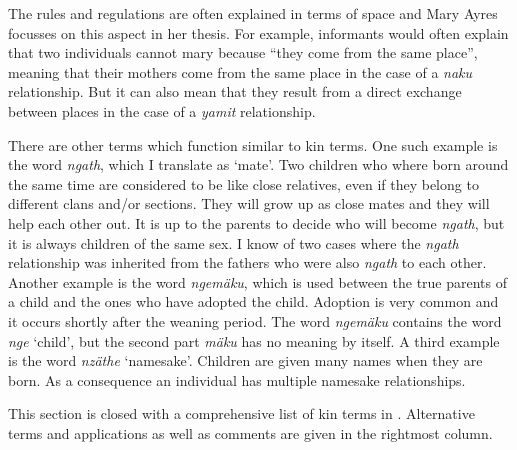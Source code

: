 The rules and regulations are often explained in terms of space and Mary Ayres focusses on this aspect in her thesis. For example, informants would often explain that two individuals cannot mary because ``they come from the same place'', meaning that their mothers come from the same place in the case of a \emph{naku} relationship. But it can also mean that they result from a direct exchange between places in the case of a \emph{yamit} relationship.%

There are other terms which function similar to kin terms. One such example is the word \emph{ngath}, which I translate as `mate'. Two children who where born around the same time are considered to be like close relatives, even if they belong to different clans and/or sections. They will grow up as close mates and they will help each other out. It is up to the parents to decide who will become \emph{ngath}, but it is always children of the same sex. I know of two cases where the \emph{ngath} relationship was inherited from the fathers who were also \emph{ngath} to each other. Another example is the word \emph{ngemäku}, which is used between the true parents of a child and the ones who have adopted the child. Adoption is very common and it occurs shortly after the weaning period. The word \emph{ngemäku} contains the word \emph{nge} `child', but the second part \emph{mäku} has no meaning by itself. A third example is the word \emph{nzäthe} `namesake'. Children are given many names when they are born. As a consequence an individual has multiple namesake relationships.%

This section is closed with a comprehensive list of kin terms in . Alternative terms and applications as well as comments are given in the rightmost column.

